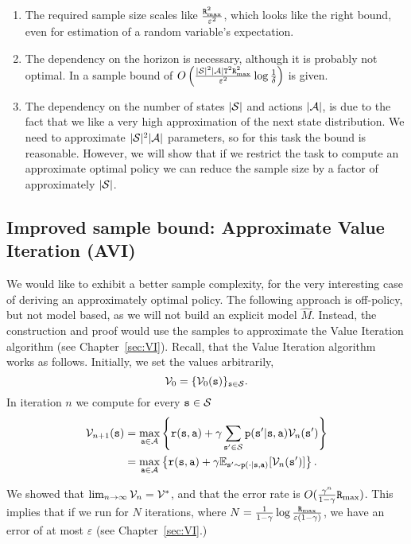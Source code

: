 \begin{enumerate}
\item
The required sample size scales like $\frac{{\tt R}_{\max }^2}{\varepsilon^2}$, which looks
like the right bound, even for estimation of a random variable's
expectation.
\item
The dependency on the horizon is necessary, although it is probably
not optimal. In \cite{DannB15} a sample bound of
$O\left(\frac{|\mathcal{S}|^2|\mathcal{A}|{\tt T}^2{\tt R}_{\max }^2}{\varepsilon^2}\log\frac{1}{\delta}
\right)$ is given.
\item
The dependency on the number of states $|\mathcal{S}|$ and
actions $|\mathcal{A}|$, is due to the fact that we like a very high
approximation of the next state distribution. We need to approximate
$|\mathcal{S}|^2|\mathcal{A}|$ parameters, so for this task the bound is
reasonable. However, we will show that if we restrict the task to
compute an approximate optimal policy we can reduce the sample size
by a factor of approximately $|\mathcal{S}|$.
\end{enumerate}

\subsection{Improved sample bound: Approximate Value
Iteration (AVI)}

We would like to exhibit a better sample complexity, for the very
interesting case of deriving an approximately optimal policy. The following approach is off-policy, but not model based, as we will not build an explicit model $\widehat{M}$.
Instead, the
construction and proof would use the samples to approximate the Value Iteration algorithm (see
Chapter~\ref{sec:VI}).
%
Recall, that the Value Iteration algorithm works as follows.
Initially, we set the values arbitrarily,
\[
\mathcal{V}_0=\{\mathcal{V}_0({\tt s})\}_{{\tt s} \in \mathcal{S}}.
\]
In iteration $n$ we compute for every ${\tt s} \in \mathcal{S}$
\begin{align*}
\mathcal{V}_{n+1}({\tt s})&=\max_{{\tt a}\in \mathcal{A}} \left\{
{\tt r}({\tt s},{\tt a})+\gamma \sum_{{\tt s}'\in \mathcal{S}}
{\tt p}({\tt s}'|{\tt s},{\tt a})
\mathcal{V}_n({\tt s}')\right\}\\
&=\max_{{\tt a}\in \mathcal{A}} \left\{ {\tt r}({\tt s},{\tt a})+\gamma
\mathbb{E}_{{\tt s}'\sim {\tt p}(\cdot |{\tt s},{\tt a})} [\mathcal{V}_n({\tt s}')]\right\}.
\end{align*}

We showed that $\lim_{n\rightarrow \infty}\mathcal{V}_n =\mathcal{V}^*$, and that the
error rate is $O(\frac{\gamma^n}{1-\gamma}{\tt R}_{\max })$.
%
This implies that if we run for $N$ iterations, where
$N=\frac{1}{1-\gamma}\log
\frac{{\tt R}_{\max }}{\varepsilon(1-\gamma)}$, we have an error of at most
$\varepsilon$ (see Chapter~\ref{sec:VI}.)



